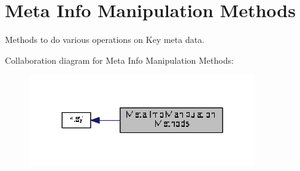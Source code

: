 \hypertarget{group__keymeta}{\section{Meta Info Manipulation Methods}
\label{group__keymeta}
}


Methods to do various operations on Key meta data.  


Collaboration diagram for Meta Info Manipulation Methods\+:
\nopagebreak
\begin{figure}[H]
\begin{center}
\leavevmode
\includegraphics[width=276pt]{group__keymeta}
\end{center}
\end{figure}
